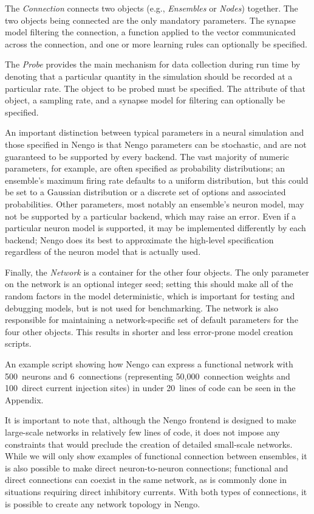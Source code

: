 \documentclass{frontiersSCNS}
\begin{document}
The \textit{Connection} connects two objects
(e.g., \textit{Ensembles} or \textit{Nodes}) together.
The two objects being connected are the only mandatory parameters.
The synapse model filtering the connection,
a function applied to the vector
communicated across the connection,
and one or more learning rules
can optionally be specified.

The \textit{Probe} provides the main mechanism
for data collection during run time
by denoting that a particular
quantity in the simulation should be recorded
at a particular rate.
The object to be probed must be specified.
The attribute of that object,
a sampling rate, and a synapse model for filtering
can optionally be specified.

An important distinction between typical
parameters in a neural simulation
and those specified in Nengo
is that Nengo parameters can be stochastic,
and are not guaranteed
to be supported by every backend.
The vast majority of numeric parameters,
for example,
are often specified as probability distributions;
an ensemble's maximum firing rate defaults to
a uniform distribution,
but this could be set to a Gaussian distribution
or a discrete set of options and associated
probabilities.
Other parameters,
most notably an ensemble's neuron model,
may not be supported by a particular backend,
which may raise an error.
Even if a particular neuron model is supported,
it may be implemented differently by each backend;
Nengo does its best to approximate
the high-level specification regardless of
the neuron model that is actually used.

Finally, the \textit{Network} is a
container for the other four objects.
The only parameter on the network
is an optional integer seed;
setting this should make
all of the random factors
in the model deterministic,
which is important for testing
and debugging models,
but is not used for benchmarking.
The network is also responsible for maintaining
a network-specific set of default parameters
for the four other objects.
This results in shorter and less error-prone
model creation scripts.

An example script showing how Nengo can
express a functional network
with 500~neurons and 6~connections
(representing 50,000~connection weights
and 100~direct current injection sites)
in under 20~lines of code
can be seen in the Appendix.

It is important to note that,
although the Nengo frontend
is designed to make large-scale networks
in relatively few lines of code,
it does not impose any constraints
that would preclude
the creation
of detailed small-scale networks.
While we will only show examples
of functional connection between ensembles,
it is also possible
to make direct neuron-to-neuron connections;
functional and direct connections
can coexist in the same network,
as is commonly done in situations
requiring direct inhibitory currents.
With both types of connections,
it is possible to create
any network topology in Nengo.
\end{document}
